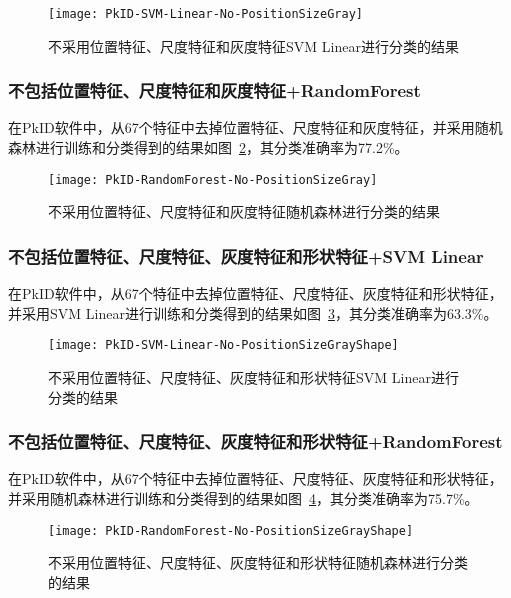 \begin{figure}[!ht]
\centering
\texttt{[image: PkID-SVM-Linear-No-PositionSizeGray]}
\caption{不采用位置特征、尺度特征和灰度特征SVM Linear进行分类的结果}
\label{fig:PkID-SVM-Linear-No-PositionSizeGray}
\end{figure}

\subsubsection{不包括位置特征、尺度特征和灰度特征+RandomForest}
在PkID软件中，从67个特征中去掉位置特征、尺度特征和灰度特征，并采用随机森林进行训练和分类得到的结果如图~\ref{fig:PkID-RandomForest-No-PositionSizeGray}，其分类准确率为77.2\%。

\begin{figure}[!ht]
\centering
\texttt{[image: PkID-RandomForest-No-PositionSizeGray]}
\caption{不采用位置特征、尺度特征和灰度特征随机森林进行分类的结果}
\label{fig:PkID-RandomForest-No-PositionSizeGray}
\end{figure}

\subsubsection{不包括位置特征、尺度特征、灰度特征和形状特征+SVM Linear}
在PkID软件中，从67个特征中去掉位置特征、尺度特征、灰度特征和形状特征，并采用SVM Linear进行训练和分类得到的结果如图~\ref{fig:PkID-SVM-Linear-No-PositionSizeGrayShape}，其分类准确率为63.3\%。

\begin{figure}[!ht]
\centering
\texttt{[image: PkID-SVM-Linear-No-PositionSizeGrayShape]}
\caption{不采用位置特征、尺度特征、灰度特征和形状特征SVM Linear进行分类的结果}
\label{fig:PkID-SVM-Linear-No-PositionSizeGrayShape}
\end{figure}

\subsubsection{不包括位置特征、尺度特征、灰度特征和形状特征+RandomForest}
在PkID软件中，从67个特征中去掉位置特征、尺度特征、灰度特征和形状特征，并采用随机森林进行训练和分类得到的结果如图~\ref{fig:PkID-RandomForest-No-PositionSizeGrayShape}，其分类准确率为75.7\%。

\begin{figure}[!ht]
\centering
\texttt{[image: PkID-RandomForest-No-PositionSizeGrayShape]}
\caption{不采用位置特征、尺度特征、灰度特征和形状特征随机森林进行分类的结果}
\label{fig:PkID-RandomForest-No-PositionSizeGrayShape}
\end{figure}

